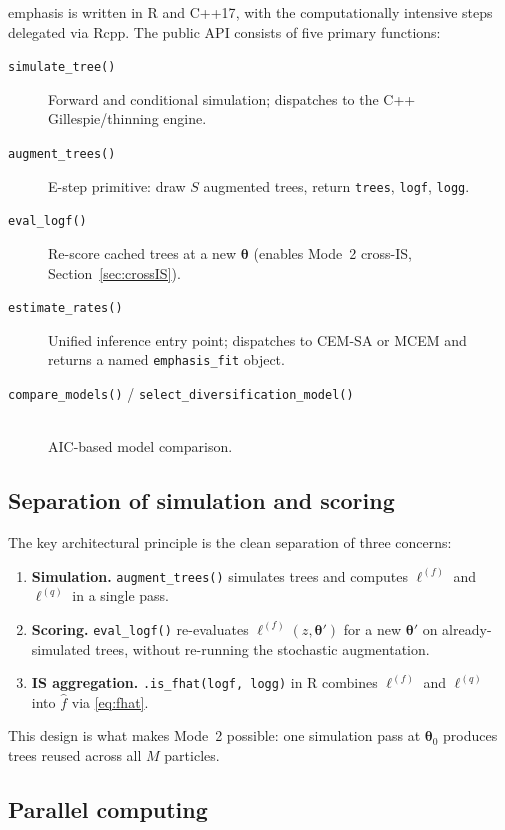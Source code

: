 \documentclass[12pt,a4paper]{article}
\newcommand{\pars}{\bm{\theta}}
\newcommand{\fhat}{\widehat{f}}
\newcommand{\logf}{\ell^{(f)}}
\newcommand{\logq}{\ell^{(q)}}
\begin{document}
\textsf{emphasis} is written in \textsf{R} and \textsf{C++17}, with the
computationally intensive steps delegated via \textsf{Rcpp}. The public API
consists of five primary functions:
\begin{description}
  \item[\texttt{simulate\_tree()}] Forward and conditional simulation;
    dispatches to the C++ Gillespie/thinning engine.
  \item[\texttt{augment\_trees()}] E-step primitive: draw $S$ augmented trees,
    return \texttt{trees}, \texttt{logf}, \texttt{logg}.
  \item[\texttt{eval\_logf()}] Re-score cached trees at a new $\pars$
    (enables Mode~2 cross-IS, Section~\ref{sec:crossIS}).
  \item[\texttt{estimate\_rates()}] Unified inference entry point; dispatches
    to CEM-SA or MCEM and returns a named \texttt{emphasis\_fit} object.
  \item[\texttt{compare\_models()} / \texttt{select\_diversification\_model()}]\mbox{}\\
    AIC-based model comparison.
\end{description}

\subsection{Separation of simulation and scoring}

The key architectural principle is the clean separation of three concerns:
\begin{enumerate}
  \item \textbf{Simulation.} \texttt{augment\_trees()} simulates trees and
    computes $\logf$ and $\logq$ in a single pass.
  \item \textbf{Scoring.} \texttt{eval\_logf()} re-evaluates $\logf(z,\pars')$
    for a new $\pars'$ on already-simulated trees, without re-running the
    stochastic augmentation.
  \item \textbf{IS aggregation.} \texttt{.is\_fhat(logf, logg)} in \textsf{R}
    combines $\logf$ and $\logq$ into $\fhat$ via \eqref{eq:fhat}.
\end{enumerate}
This design is what makes Mode~2 possible: one simulation pass at $\pars_0$
produces trees reused across all $M$ particles.

\subsection{Parallel computing}\label{sec:parallel}
\end{document}
